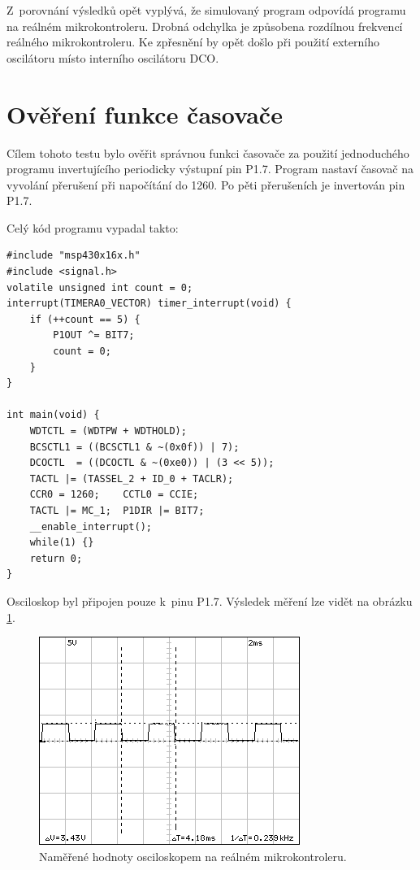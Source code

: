 Z~porovnání výsledků opět vyplývá, že simulovaný program odpovídá programu na reálném mikrokontroleru. Drobná odchylka je způsobena rozdílnou frekvencí reálného mikrokontroleru. Ke zpřesnění by opět došlo při použití externího oscilátoru místo interního oscilátoru DCO.

\section{Ověření funkce časovače}
\label{test3}

Cílem tohoto testu bylo ověřit správnou funkci časovače za použití jednoduchého programu invertujícího periodicky výstupní pin P1.7. Program nastaví časovač na vyvolání přerušení při napočítání do 1260. Po pěti přerušeních je invertován pin P1.7.

Celý kód programu vypadal takto:

\lstset{language=XML, numbers=left, frame=single, breaklines=true, tabsize=2, xleftmargin=20pt}
\begin{lstlisting}
#include "msp430x16x.h"
#include <signal.h>
volatile unsigned int count = 0;
interrupt(TIMERA0_VECTOR) timer_interrupt(void) {
	if (++count == 5) {
		P1OUT ^= BIT7;
		count = 0;
	}
}

int main(void) {
	WDTCTL = (WDTPW + WDTHOLD);
	BCSCTL1 = ((BCSCTL1 & ~(0x0f)) | 7);
	DCOCTL  = ((DCOCTL & ~(0xe0)) | (3 << 5));
	TACTL |= (TASSEL_2 + ID_0 + TACLR);
	CCR0 = 1260;	CCTL0 = CCIE;
	TACTL |= MC_1; 	P1DIR |= BIT7;
	__enable_interrupt();
	while(1) {}
	return 0;
}

\end{lstlisting}

Osciloskop byl připojen pouze k~pinu P1.7. Výsledek měření lze vidět na obrázku \ref{fig:dso06osc}.

\begin{figure}[ht]
\centering
\includegraphics[trim=0cm 0cm 0cm 0cm]{fig/dso06}
\caption{Naměřené hodnoty osciloskopem na reálném mikrokontroleru.}
\label{fig:dso06osc}
\end{figure}

